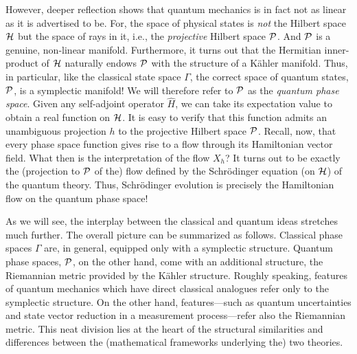\documentclass[12pt,aps,eqsecnum,tighten]{revtex4-2}
\def\H{{\cal H}}
\def\P{{\cal P}}
\begin{document}
However, deeper reflection shows that quantum mechanics is in fact not
as linear as it is advertised to be. For, the space of physical states
is {\it not} the Hilbert space $\H$ but the space of rays in it, i.e.,
the {\it projective} Hilbert space $\P$. And $\P$ is a genuine,
non-linear manifold. Furthermore, it turns out that the Hermitian
inner-product of $\H$ naturally endows $\P$ with the structure of a
K\"ahler manifold. Thus, in particular, like the classical state space
$\Gamma$, the correct space of quantum states, $\P$, is a symplectic
manifold! We will therefore refer to $\P$ as the {\it quantum phase
space}. Given any self-adjoint operator $\hat{H}$, we can take its
expectation value to obtain a real function on $\H$. It is easy to
verify that this function admits an unambiguous projection $h$ to the
projective Hilbert space $\P$. Recall, now, that every phase space
function gives rise to a flow through its Hamiltonian vector field.
What then is the interpretation of the flow $X_h$? It turns out
\cite{kibble} to be exactly the (projection to $\P$ of the) flow
defined by the Schr\"odinger equation (on $\H$) of the quantum theory.
Thus, Schr\"odinger evolution is precisely the Hamiltonian flow on the
quantum phase space!

As we will see, the interplay between the classical and quantum ideas
stretches much further. The overall picture can be summarized as
follows. Classical phase spaces $\Gamma$ are, in general, equipped
only with a symplectic structure.  Quantum phase spaces, $\P$, on the
other hand, come with an additional structure, the Riemannian metric
provided by the K\"ahler structure.  Roughly speaking, features of
quantum mechanics which have direct classical analogues refer only to
the symplectic structure.  On the other hand, features---such as
quantum uncertainties and state vector reduction in a measurement
process---refer also the Riemannian metric. This neat division lies at
the heart of the structural similarities and differences between the
(mathematical frameworks underlying the) two theories.
\end{document}
